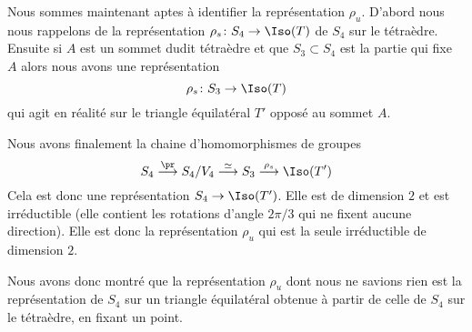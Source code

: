 \begin{normaltext}      \label{NORMooQQCYooILyOxc}
	Nous sommes maintenant aptes à identifier la représentation \( \rho_u\). D'abord nous nous rappelons de la représentation \( \rho_s\colon S_4\to \Iso(T)\) de \( S_4\) sur le tétraèdre. Ensuite si \( A\) est un sommet dudit tétraèdre et que \( S_3\subset S_4\) est la partie qui fixe \( A\) alors nous avons une représentation
	\begin{equation}
		\rho_s\colon S_3\to \Iso(T)
	\end{equation}
	qui agit en réalité sur le triangle équilatéral \( T'\) opposé au sommet \( A\).

	Nous avons finalement la chaine d'homomorphismes de groupes
	\begin{equation}
		S_4\stackrel{\pr}{\longrightarrow} S_4/V_4\stackrel{\simeq}{\longrightarrow} S_3\stackrel{\rho_s}{\longrightarrow}\Iso(T')
	\end{equation}
	Cela est donc une représentation \( S_4\to\Iso(T')\). Elle est de dimension \( 2\) et est irréductible (elle contient les rotations d'angle \( 2\pi/3\) qui ne fixent aucune direction). Elle est donc la représentation \( \rho_u\) qui est la seule irréductible de dimension \( 2\).

	Nous avons donc montré que la représentation \( \rho_u\) dont nous ne savions rien est la représentation de \( S_4\) sur un triangle équilatéral obtenue à partir de celle de \( S_4\) sur le tétraèdre, en fixant un point.
\end{normaltext}

